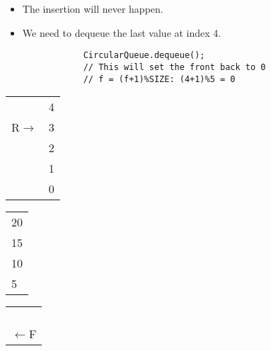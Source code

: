 \begin{center}
\begin{itemize}
        \item The insertion will never happen. 
        \item We need to dequeue the last value at index 4.
        \begin{verbatim}
            CircularQueue.dequeue();
            // This will set the front back to 0
            // f = (f+1)%SIZE: (4+1)%5 = 0
        \end{verbatim}
    \end{itemize}
    \begin{tabular}{ cc }
        {}&{4} \\ {R$\rightarrow$}&{3} \\ {}&{2} \\ {}&{1} \\ {}&{0} \\
    \end{tabular}
    \begin{tabular}{|p{0.75cm}|}
        \hline {} \\ \hline {20} \\ \hline {15} \\ \hline {10} \\ \hline {5} \\ \hline
    \end{tabular}
    \begin{tabular}{ c }
        {} \\ {} \\ {} \\ {} \\ {$\leftarrow$F} \\
    \end{tabular}
    


\end{center}

